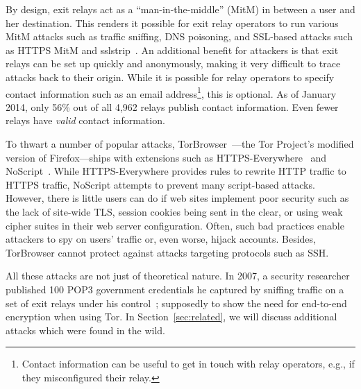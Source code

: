 \documentclass[letterpaper,twocolumn,10pt]{article}
\begin{document}
By design, exit relays act as a ``man-in-the-middle'' (MitM) in between a user and her
destination.  This renders it possible for exit relay operators to run various MitM attacks such as
traffic sniffing, DNS poisoning, and SSL-based attacks such as HTTPS MitM and
sslstrip~\cite{sslstrip}.  An additional benefit for attackers is that exit relays can be set up
quickly and anonymously, making it very difficult to trace attacks back to their origin.  While it
is possible for relay operators to specify contact information such as an email
address\footnote{Contact information can be useful to get in touch with relay operators, e.g., if
they misconfigured their relay.}, this is optional.  As of January 2014, only 56\% out of all 4,962
relays publish contact information.  Even fewer relays have \emph{valid} contact information.

To thwart a number of popular attacks, TorBrowser~\cite{torbrowser}---the Tor Project's modified
version of Firefox---ships with extensions such as HTTPS-Everywhere~\cite{httpseverywhere} and
NoScript~\cite{noscript}.  While HTTPS-Everywhere provides rules to rewrite HTTP traffic to HTTPS
traffic, NoScript attempts to prevent many script-based attacks.  However, there is little users can
do if web sites implement poor security such as the lack of site-wide TLS, session cookies being
sent in the clear, or using weak cipher suites in their web server configuration.  Often, such bad
practices enable attackers to spy on users' traffic or, even worse, hijack accounts.  Besides,
TorBrowser cannot protect against attacks targeting protocols such as SSH.

All these attacks are not just of theoretical nature.  In 2007, a security researcher published 100
POP3 government credentials he captured by sniffing traffic on a set of exit relays under his
control~\cite{egerstad}; supposedly to show the need for end-to-end encryption when using Tor.  In
Section~\ref{sec:related}, we will discuss additional attacks which were found in the wild.
\end{document}
